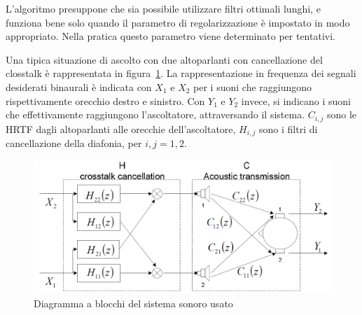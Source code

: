 \documentclass[12pt,a4paper,titlepage]{article}
\begin{document}
L'algoritmo presuppone che sia possibile utilizzare filtri ottimali lunghi, e funziona bene solo quando il parametro di regolarizzazione è impostato in modo appropriato. Nella pratica questo parametro viene determinato per tentativi.%

Una tipica situazione di ascolto con due altoparlanti con cancellazione del closstalk è rappresentata in figura~\ref{fig:head}. La rappresentazione in frequenza dei segnali desiderati binaurali è indicata con $X_1$ e $X_2$ per i suoni che raggiungono rispettivamente orecchio destro e sinistro.
Con $Y_1$ e $Y_2$ invece, si indicano i suoni che effettivamente raggiungono l'ascoltatore, attraversando il sistema. $C_{i, j}$ sono le HRTF dagli altoparlanti alle orecchie dell'ascoltatore, $H_{i,j}$ sono i filtri di cancellazione della diafonia, per $i , j =1,2$.
\begin{figure}[h]
	\centering	
	\includegraphics[width=1\textwidth]{Immagini/head}
	\caption{Diagramma a blocchi del sistema sonoro usato}
	\label{fig:head}
\end{figure}
\end{document}
